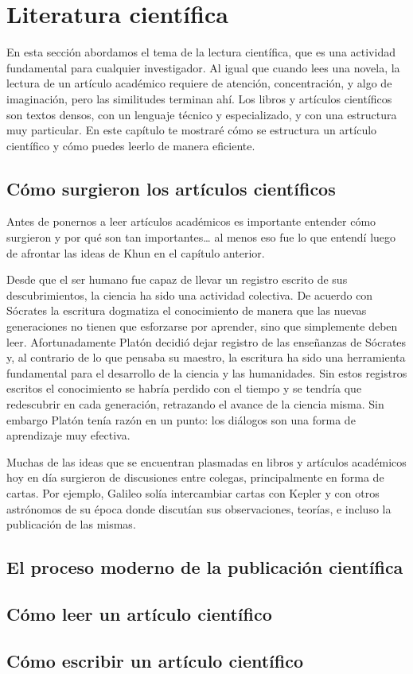 \chapter{Literatura científica}
\label{cha:literaturacientifica}

En esta sección abordamos el tema de la lectura científica, que es una actividad
fundamental para cualquier investigador.
Al igual que cuando lees una novela, la lectura de un artículo académico
requiere de atención, concentración, y algo de imaginación, pero las similitudes
terminan ahí.
Los libros y artículos científicos son textos densos, con un lenguaje técnico y
especializado, y con una estructura muy particular.
En este capítulo te mostraré cómo se estructura un artículo científico y cómo
puedes leerlo de manera eficiente.

\section{Cómo surgieron los artículos científicos}
\label{sec:contexto}
Antes de ponernos a leer artículos académicos es importante entender cómo
surgieron y por qué son tan importantes… al menos eso fue lo que entendí luego
de afrontar las ideas de Khun en el capítulo anterior.

Desde que el ser humano fue capaz de llevar un registro escrito de sus
descubrimientos, la ciencia ha sido una actividad colectiva.
De acuerdo con Sócrates la escritura dogmatiza el conocimiento de manera que las
nuevas generaciones no tienen que esforzarse por aprender, sino que simplemente
deben leer.
Afortunadamente Platón decidió dejar registro de las enseñanzas de Sócrates y,
al contrario de lo que pensaba su maestro, la escritura ha sido una herramienta
fundamental para el desarrollo de la ciencia y las humanidades.
Sin estos registros escritos el conocimiento se habría perdido con el tiempo y
se tendría que redescubrir en cada generación, retrazando el avance de la
ciencia misma.
Sin embargo Platón tenía razón en un punto: los diálogos son una forma de
aprendizaje muy efectiva.

Muchas de las ideas que se encuentran plasmadas en libros y artículos académicos
hoy en día surgieron de discusiones entre colegas, principalmente en forma de
cartas.
Por ejemplo, Galileo solía intercambiar cartas con Kepler y con otros astrónomos
de su época donde discutían sus observaciones, teorías, e incluso la publicación
de las mismas.


\section{El proceso moderno de la publicación científica}
\label{sec:procesopublicacion}

\section{Cómo leer un artículo científico}
\label{sec:comoleer}

\section{Cómo escribir un artículo científico}
\label{sec:comoescribir}